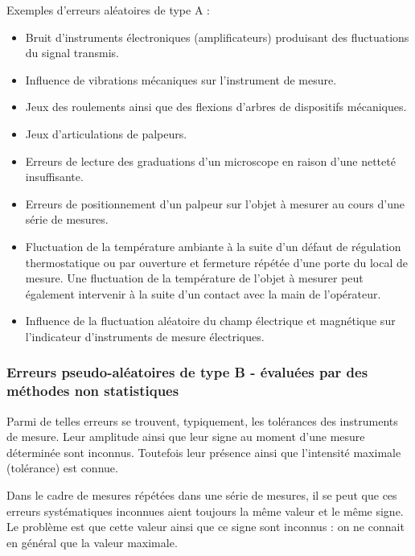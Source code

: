 Exemples d'erreurs aléatoires de type A :
\begin{itemize}

\item Bruit d'instruments électroniques (amplificateurs) produisant des fluctuations du signal transmis.
\item Influence de vibrations mécaniques sur l'instrument de mesure.
\item Jeux des roulements ainsi que des flexions d'arbres de dispositifs mécaniques.
\item Jeux d'articulations de palpeurs.
\item Erreurs de lecture des graduations d'un microscope en raison d'une netteté insuffisante.
\item Erreurs de positionnement d'un palpeur sur l'objet à mesurer au cours d'une série de mesures.
\item Fluctuation de la température ambiante à la suite d'un défaut de régulation thermostatique ou par ouverture et fermeture répétée d'une porte du local de mesure. Une fluctuation de la température de l'objet à mesurer peut également intervenir à la suite d'un contact avec la main de l'opérateur.
\item Influence de la fluctuation aléatoire du champ électrique et magnétique sur l'indicateur d'instruments de mesure électriques.
\end{itemize}

\subsubsection{Erreurs pseudo-aléatoires de type B - évaluées par des méthodes non statistiques}

Parmi de telles erreurs se trouvent, typiquement, les tolérances des instruments de mesure. Leur amplitude ainsi que leur signe au moment d'une mesure déterminée sont inconnus. Toutefois leur présence ainsi que l'intensité maximale (tolérance) est connue.

Dans le cadre de mesures répétées dans une série de mesures, il se peut que ces erreurs systématiques inconnues aient toujours la même valeur et le même signe.  Le problème est que cette valeur ainsi que ce signe sont inconnus : on ne connait en général que la valeur maximale.

